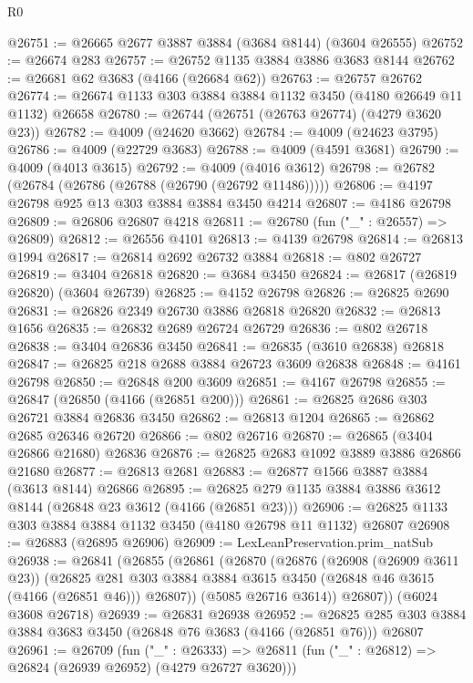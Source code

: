 \begin{lexlean}{R0}
\begin{coremodule}
@26751 := @26665 @2677 @3887 @3884 (@3684 @8144) (@3604 @26555)
@26752 := @26674 @283
@26757 := @26752 @1135 @3884 @3886 @3683 @8144
@26762 := @26681 @62 @3683 (@4166 (@26684 @62))
@26763 := @26757 @26762
@26774 := @26674 @1133 @303 @3884 @3884 @1132 @3450 (@4180 @26649 @11 @1132) @26658
@26780 := @26744 (@26751 (@26763 @26774) (@4279 @3620 @23))
@26782 := @4009 (@24620 @3662)
@26784 := @4009 (@24623 @3795)
@26786 := @4009 (@22729 @3683)
@26788 := @4009 (@4591 @3681)
@26790 := @4009 (@4013 @3615)
@26792 := @4009 (@4016 @3612)
@26798 := @26782 (@26784 (@26786 (@26788 (@26790 (@26792 @11486)))))
@26806 := @4197 @26798 @925 @13 @303 @3884 @3884 @3450 @4214
@26807 := @4186 @26798
@26809 := @26806 @26807 @4218
@26811 := @26780 (fun ("_" : @26557) => @26809)
@26812 := @26556 @4101
@26813 := @4139 @26798
@26814 := @26813 @1994
@26817 := @26814 @2692 @26732 @3884
@26818 := @802 @26727
@26819 := @3404 @26818
@26820 := @3684 @3450
@26824 := @26817 (@26819 @26820) (@3604 @26739)
@26825 := @4152 @26798
@26826 := @26825 @2690
@26831 := @26826 @2349 @26730 @3886 @26818 @26820
@26832 := @26813 @1656
@26835 := @26832 @2689 @26724 @26729
@26836 := @802 @26718
@26838 := @3404 @26836 @3450
@26841 := @26835 (@3610 @26838) @26818
@26847 := @26825 @218 @2688 @3884 @26723 @3609 @26838
@26848 := @4161 @26798
@26850 := @26848 @200 @3609
@26851 := @4167 @26798
@26855 := @26847 (@26850 (@4166 (@26851 @200)))
@26861 := @26825 @2686 @303 @26721 @3884 @26836 @3450
@26862 := @26813 @1204
@26865 := @26862 @2685 @26346 @26720
@26866 := @802 @26716
@26870 := @26865 (@3404 @26866 @21680) @26836
@26876 := @26825 @2683 @1092 @3889 @3886 @26866 @21680
@26877 := @26813 @2681
@26883 := @26877 @1566 @3887 @3884 (@3613 @8144) @26866
@26895 := @26825 @279 @1135 @3884 @3886 @3612 @8144 (@26848 @23 @3612 (@4166 (@26851 @23)))
@26906 := @26825 @1133 @303 @3884 @3884 @1132 @3450 (@4180 @26798 @11 @1132) @26807
@26908 := @26883 (@26895 @26906)
@26909 := LexLeanPreservation.prim_natSub
@26938 := @26841
    (@26855
      (@26861
        (@26870
          (@26876
            (@26908 (@26909 @3611 @23))
            (@26825
              @281
              @303
              @3884
              @3884
              @3615
              @3450
              (@26848 @46 @3615 (@4166 (@26851 @46)))
              @26807))
          (@5085 @26716 @3614))
        @26807))
    (@6024 @3608 @26718)
@26939 := @26831 @26938
@26952 := @26825 @285 @303 @3884 @3884 @3683 @3450 (@26848 @76 @3683 (@4166 (@26851 @76))) @26807
@26961 := @26709
    (fun ("_" : @26333) =>
    @26811 (fun ("_" : @26812) => @26824 (@26939 @26952) (@4279 @26727 @3620)))

\end{coremodule}
\end{lexlean}
